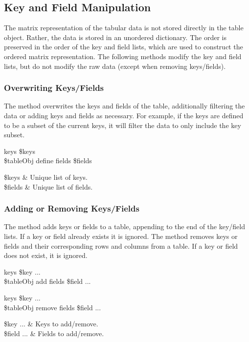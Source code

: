 \subsection{Key and Field Manipulation}
The matrix representation of the tabular data is not stored directly in the table object. 
Rather, the data is stored in an unordered dictionary. 
The order is preserved in the order of the key and field lists, which are used to construct the ordered matrix representation.
The following methods modify the key and field lists, but do not modify the raw data (except when removing keys/fields).

\subsubsection{Overwriting Keys/Fields}
The method  overwrites the keys and fields of the table, additionally filtering the data or adding keys and fields as necessary. 
For example, if the keys are defined to be a subset of the current keys, it will filter the data to only include the key subset. 
\begin{syntax}
 keys \$keys \\
\$tableObj define fields \$fields
\end{syntax}
\begin{args}
\$keys & Unique list of keys. \\
\$fields & Unique list of fields.
\end{args}

\subsubsection{Adding or Removing Keys/Fields}
The method  adds keys or fields to a table, appending to the end of the key/field lists. 
If a key or field already exists it is ignored.
The method   removes keys or fields and their corresponding rows and columns from a table. If a key or field does not exist, it is ignored. 
\begin{syntax}
 keys \$key ... \\
\$tableObj add fields \$field ...
\end{syntax}
\begin{syntax}
 keys \$key ... \\
\$tableObj remove fields \$field ...
\end{syntax}
\begin{args}
\$key ... & Keys to add/remove. \\
\$field ... & Fields to add/remove.
\end{args}
\clearpage


